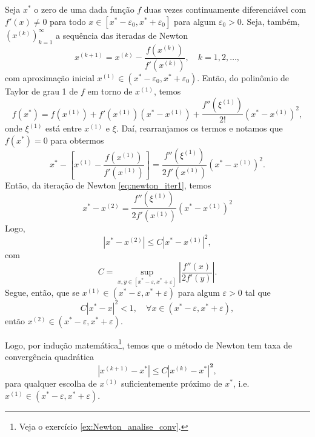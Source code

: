 Seja $x^*$ o zero de uma dada função $f$ duas vezes continuamente diferenciável com $f'(x)\neq 0$ para todo $x\in [x^*-\varepsilon_0, x^*+\varepsilon_0]$ para algum $\varepsilon_0>0$. Seja, também, $(x^{(k)})_{k=1}^\infty$ a sequência das iteradas de Newton
\begin{equation}\label{eq:newton_iter1}
  x^{(k+1)} = x^{(k)} - \frac{f(x^{(k)})}{f'(x^{(k)})},\quad k=1, 2, \ldots,
\end{equation}
com aproximação inicial $x^{(1)}\in (x^*-\varepsilon_0, x^*+\varepsilon_0)$. Então, do polinômio de Taylor de grau 1 de $f$ em torno de $x^{(1)}$, temos
\begin{equation}
  f(x^*) = f(x^{(1)}) + f'(x^{(1)})(x^* - x^{(1)}) + \frac{f''(\xi^{(1)})}{2!}(x^*-x^{(1)})^2,
\end{equation}
onde $\xi^{(1)}$ está entre $x^{(1)}$ e $\xi$. Daí, rearranjamos os termos e notamos que $f(x^*)=0$ para obtermos
\begin{equation}
  x^* - \left[x^{(1)} - \frac{f(x^{(1)})}{f'(x^{(1)})}\right] = \frac{f''(\xi^{(1)})}{2f'(x^{(1)})}(x^*-x^{(1)})^2.
\end{equation}
Então, da iteração de Newton \eqref{eq:newton_iter1}, temos
\begin{equation}
  x^* - x^{(2)} = \frac{f''(\xi^{(1)})}{2f'(x^{(1)})}(x^* - x^{(1)})^2
\end{equation}
Logo,
\begin{equation}\label{eq:newton_taxa_1}
  |x^* - x^{(2)}| \leq C |x^* - x^{(1)}|^2,
\end{equation}
com
\begin{equation}
  C = \sup_{x,y\in [x^*-\varepsilon, x^*+\varepsilon]} \left|\frac{f''(x)}{2f'(y)}\right|.
\end{equation}
Segue, então, que se $x^{(1)}\in (x^*-\varepsilon, x^* + \varepsilon)$ para algum $\varepsilon>0$ tal que
\begin{equation}
  C |x^* - x|^2 < 1,\quad\forall x\in (x^*-\varepsilon, x^* + \varepsilon),
\end{equation}
então $x^{(2)}\in (x^*-\varepsilon, x^*+\varepsilon)$.

Logo, por indução matemática\footnote{Veja o exercício \ref{ex:Newton_analise_conv}.}, temos que o método de Newton tem taxa de convergência quadrática
\begin{equation}\label{eq:Newton_taxa_quadratica}
  |x^{(k+1)}-x^*| \leq C|x^{(k)}-x^{*}|^{\pmb{2}},
\end{equation}
para qualquer escolha de $x^{(1)}$ suficientemente próximo de $x^*$, i.e. $x^{(1)}\in (x^*-\varepsilon, x^*+\varepsilon)$.

